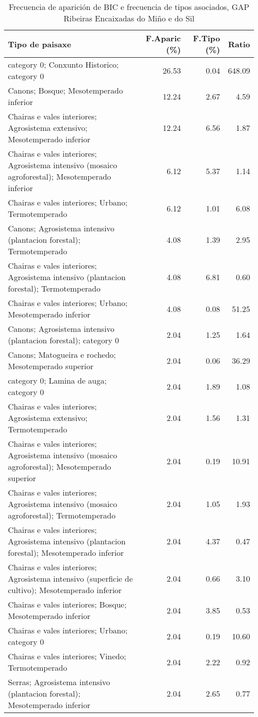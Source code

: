 \begin{table}[p]
\centering
\caption{Frecuencia de aparición de BIC e frecuencia de tipos asociados, GAP Ribeiras Encaixadas do Miño e do Sil} 
\label{vbic4}
\begin{tabular}{lrrr}
  \hline
Tipo de paisaxe & F.Aparic (\%) & F.Tipo (\%) & Ratio \\ 
  \hline
category 0; Conxunto Historico; category 0 & 26.53 & 0.04 & 648.09 \\ 
  Canons; Bosque; Mesotemperado inferior & 12.24 & 2.67 & 4.59 \\ 
  Chairas e vales interiores; Agrosistema extensivo; Mesotemperado inferior & 12.24 & 6.56 & 1.87 \\ 
  Chairas e vales interiores; Agrosistema intensivo (mosaico agroforestal); Mesotemperado inferior & 6.12 & 5.37 & 1.14 \\ 
  Chairas e vales interiores; Urbano; Termotemperado & 6.12 & 1.01 & 6.08 \\ 
  Canons; Agrosistema intensivo (plantacion forestal); Termotemperado & 4.08 & 1.39 & 2.95 \\ 
  Chairas e vales interiores; Agrosistema intensivo (plantacion forestal); Termotemperado & 4.08 & 6.81 & 0.60 \\ 
  Chairas e vales interiores; Urbano; Mesotemperado inferior & 4.08 & 0.08 & 51.25 \\ 
  Canons; Agrosistema intensivo (plantacion forestal); category 0 & 2.04 & 1.25 & 1.64 \\ 
  Canons; Matogueira e rochedo; Mesotemperado superior & 2.04 & 0.06 & 36.29 \\ 
  category 0; Lamina de auga; category 0 & 2.04 & 1.89 & 1.08 \\ 
  Chairas e vales interiores; Agrosistema extensivo; Termotemperado & 2.04 & 1.56 & 1.31 \\ 
  Chairas e vales interiores; Agrosistema intensivo (mosaico agroforestal); Mesotemperado superior & 2.04 & 0.19 & 10.91 \\ 
  Chairas e vales interiores; Agrosistema intensivo (mosaico agroforestal); Termotemperado & 2.04 & 1.05 & 1.93 \\ 
  Chairas e vales interiores; Agrosistema intensivo (plantacion forestal); Mesotemperado inferior & 2.04 & 4.37 & 0.47 \\ 
  Chairas e vales interiores; Agrosistema intensivo (superficie de cultivo); Mesotemperado inferior & 2.04 & 0.66 & 3.10 \\ 
  Chairas e vales interiores; Bosque; Mesotemperado inferior & 2.04 & 3.85 & 0.53 \\ 
  Chairas e vales interiores; Urbano; category 0 & 2.04 & 0.19 & 10.60 \\ 
  Chairas e vales interiores; Vinedo; Termotemperado & 2.04 & 2.22 & 0.92 \\ 
  Serras; Agrosistema intensivo (plantacion forestal); Mesotemperado inferior & 2.04 & 2.65 & 0.77 \\ 
   \hline
\end{tabular}
\end{table}
